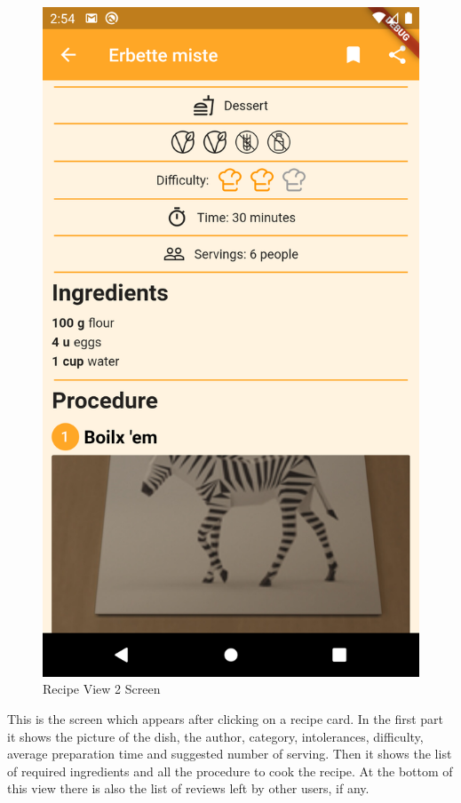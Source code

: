 \begin{figure}[H]
\begin{minipage}{0.48\textwidth}
		\includegraphics[width = .7\linewidth]{img/RecipeView_2.png}
		\caption{Recipe View 2 Screen}
	\end{minipage}
\end{figure}
This is the screen which appears after clicking on a recipe card.
In the first part it shows the picture of the dish, the author, category, intolerances, difficulty, average preparation time and suggested number of serving.
Then it shows the list of required ingredients and all the procedure to cook the recipe.
At the bottom of this view there is also the list of reviews left by other users, if any.

